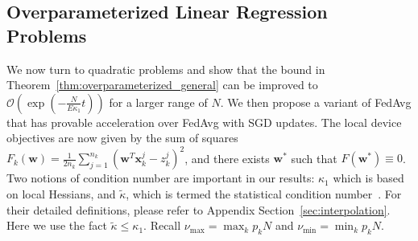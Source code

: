 \subsection{Overparameterized Linear Regression Problems}

We now turn to quadratic problems and show that the bound in Theorem~\ref{thm:overparameterized_general} can be improved to $\mathcal{O}(\exp(-\frac{N}{E\kappa_{1}}t))$ for a larger range of $N$. We then propose a variant of FedAvg that has provable acceleration over FedAvg with SGD updates. The local device objectives are now given by the sum of squares {\small$F_{k}(\mathbf{w})=\frac{1}{2n_{k}}\sum_{j=1}^{n_{k}}(\mathbf{w}^{T}\mathbf{x}_{k}^{j}-z_{k}^{j})^{2}$},
and there exists $\mathbf{w}^{\ast}$ such that $F(\mathbf{w}^{\ast})\equiv0$. Two notions of condition number are important in our results: $\kappa_1$ which is based on local Hessians, and $\tilde{\kappa}$, which is termed the statistical condition number~\cite{liu2018accelerating,jain2017accelerating}. For their detailed definitions, please refer to Appendix Section~\ref{sec:interpolation}. Here we use the fact $\tilde{\kappa} \leq \kappa_1$. Recall $\nu_{\max}=\max _k p_k N$ and $\nu_{\min}=\min _k p_k N$.

\begin{comment}
Define the local Hessian matrix as $H^{k}:=\frac{1}{n_{k}}\sum_{j=1}^{n_{k}}\mathbf{x}_{k}^{j}(\mathbf{x}_{k}^{j})^{T}$, and the stochastic Hessian matrix as $\tilde{H}_{t}^{k}:=\xi_{t}^{k}(\xi_{t}^{k})^{T}$. Define $l$ to be the smallest positive number such that $\mathbb{E}\|\xi_{t}^{k}\|^{2}$$\mathbf{\xi}_{t}^{k}$($\mathbf{\xi}_{t}^{k})^{T}\preceq lH^{k}$
for all $k$. Note that $l\leq\max_{k,j}\|\mathbf{x}_{k}^{j}\|^{2}$.
Let $L$ and $\mu$ be lower and upper bounds of non-zero eigenvalues
of $H^{k}$. Define $\kappa_{1}:=l/\mu$ and $\kappa:=L/\mu$. Following
\cite{liu2018accelerating,jain2017accelerating}, we define the statistical
condition number $\tilde{\kappa}$ as the smallest positive real number
such that $\mathbb{E}\left[\langle\xi_{t}^{k}(H^{k})^{-1},\xi_{t}^{k}\rangle\xi_{t}^{k}(\xi_{t}^{k})^{T}\right] \  \preceq\tilde{\kappa}H^{k}$, for all $k$. 
The condition numbers $\kappa_{1}$ and $\tilde{\kappa}$
are important in the characterization of convergence rates for FedAvg
algorithms. Note that $\kappa_{1}>\kappa$ and $\kappa_{1}>\tilde{\kappa}$.
\end{comment}

